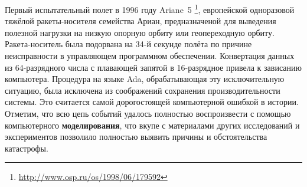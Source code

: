 Первый испытательный полет в 1996 году Ariane~5 \cite{journal:open_system:1998_adjaev}\footnote{\url{http://www.osp.ru/os/1998/06/179592}},
европейской одноразовой тяжёлой ракеты-носителя семейства Ариан,
предназначеной для выведения полезной нагрузки на низкую опорную орбиту или геопереходную орбиту. 
%
Ракета-носитель была подорвана на 34-й секунде полёта по причине неисправности в управляющем программном обеспечении.
Конвертация данных из 64-разрядного числа с плавающей запятой в 16-разрядное привела к зависанию компьютера.
Процедура на языке Ada, обрабатывающая эту исключительную ситуацию, была исключена из соображений сохранения производительности системы.
%
Это считается самой дорогостоящей компьютерной ошибкой в истории.
Отметим, что всю цепь событий удалось полностью воспроизвести с помощью компьютерного \textbf{моделирования},
что вкупе с материалами других исследований и экспериментов позволило полностью выявить причины и обстоятельства катастрофы.